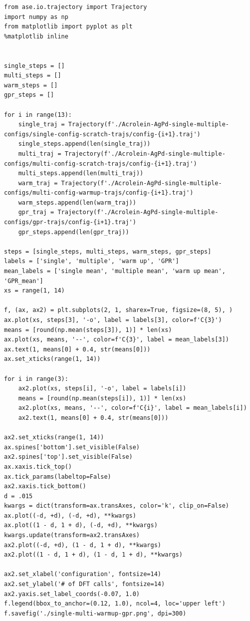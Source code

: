 \documentclass[aps,prl,citeautoscript,preprint,citeautoscript,showkeys]{revtex4-1}
\begin{document}
\begin{verbatim}
from ase.io.trajectory import Trajectory
import numpy as np
from matplotlib import pyplot as plt
%matplotlib inline


single_steps = []
multi_steps = []
warm_steps = []
gpr_steps = []

for i in range(13):
    single_traj = Trajectory(f'./Acrolein-AgPd-single-multiple-configs/single-config-scratch-trajs/config-{i+1}.traj')
    single_steps.append(len(single_traj))
    multi_traj = Trajectory(f'./Acrolein-AgPd-single-multiple-configs/multi-config-scratch-trajs/config-{i+1}.traj')
    multi_steps.append(len(multi_traj))
    warm_traj = Trajectory(f'./Acrolein-AgPd-single-multiple-configs/multi-config-warmup-trajs/config-{i+1}.traj')
    warm_steps.append(len(warm_traj))
    gpr_traj = Trajectory(f'./Acrolein-AgPd-single-multiple-configs/gpr-trajs/config-{i+1}.traj')
    gpr_steps.append(len(gpr_traj))

steps = [single_steps, multi_steps, warm_steps, gpr_steps]
labels = ['single', 'multiple', 'warm up', 'GPR']
mean_labels = ['single mean', 'multiple mean', 'warm up mean', 'GPR_mean']
xs = range(1, 14)

f, (ax, ax2) = plt.subplots(2, 1, sharex=True, figsize=(8, 5), )
ax.plot(xs, steps[3], '-o', label = labels[3], color=f'C{3}')
means = [round(np.mean(steps[3]), 1)] * len(xs)
ax.plot(xs, means, '--', color=f'C{3}', label = mean_labels[3])
ax.text(1, means[0] + 0.4, str(means[0]))
ax.set_xticks(range(1, 14))

for i in range(3):
    ax2.plot(xs, steps[i], '-o', label = labels[i])
    means = [round(np.mean(steps[i]), 1)] * len(xs)
    ax2.plot(xs, means, '--', color=f'C{i}', label = mean_labels[i])
    ax2.text(1, means[0] + 0.4, str(means[0]))

ax2.set_xticks(range(1, 14))
ax.spines['bottom'].set_visible(False)
ax2.spines['top'].set_visible(False)
ax.xaxis.tick_top()
ax.tick_params(labeltop=False)
ax2.xaxis.tick_bottom()
d = .015
kwargs = dict(transform=ax.transAxes, color='k', clip_on=False)
ax.plot((-d, +d), (-d, +d), **kwargs) 
ax.plot((1 - d, 1 + d), (-d, +d), **kwargs)
kwargs.update(transform=ax2.transAxes)
ax2.plot((-d, +d), (1 - d, 1 + d), **kwargs)
ax2.plot((1 - d, 1 + d), (1 - d, 1 + d), **kwargs)

ax2.set_xlabel('configuration', fontsize=14)
ax2.set_ylabel('# of DFT calls', fontsize=14)
ax2.yaxis.set_label_coords(-0.07, 1.0)
f.legend(bbox_to_anchor=(0.12, 1.0), ncol=4, loc='upper left')
f.savefig('./single-multi-warmup-gpr.png', dpi=300)
\end{verbatim}
\end{document}

